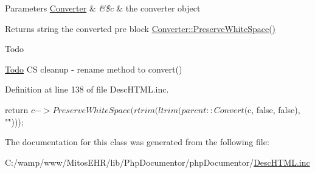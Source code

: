 \begin{DoxyParams}[1]{\-Parameters}
\hyperlink{class_converter}{\-Converter} & {\em \&\$c} & the converter object\\
\hline
\end{DoxyParams}
\begin{DoxyReturn}{\-Returns}
string the converted pre block  \hyperlink{class_converter_a94ba8968fdf93aced6fd0b712860315d}{\-Converter\-::\-Preserve\-White\-Space()} 
\end{DoxyReturn}
\begin{DoxyRefDesc}{\-Todo}
\item[\hyperlink{todo__todo000033}{\-Todo}]\-C\-S cleanup -\/ rename method to convert() \end{DoxyRefDesc}


\-Definition at line 138 of file \-Desc\-H\-T\-M\-L.\-inc.


\begin{DoxyCode}
    {
        return $c->PreserveWhiteSpace(rtrim(ltrim(parent::Convert($c,
            false, false), "\n\r")));
    }
\end{DoxyCode}


\-The documentation for this class was generated from the following file\-:\begin{DoxyCompactItemize}
\item 
\-C\-:/wamp/www/\-Mitos\-E\-H\-R/lib/\-Php\-Documentor/php\-Documentor/\hyperlink{_desc_h_t_m_l_8inc}{\-Desc\-H\-T\-M\-L.\-inc}\end{DoxyCompactItemize}
